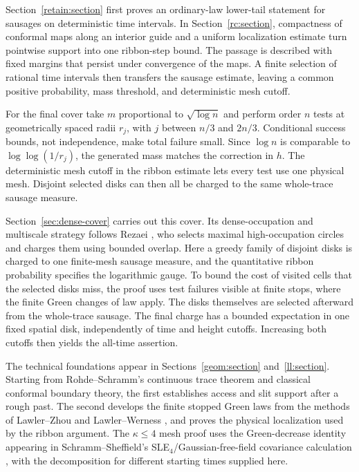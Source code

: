 Section~\ref{retain:section} first proves an ordinary-law lower-tail
statement for sausages on deterministic time intervals. In
Section~\ref{rc:section}, compactness of conformal maps along an interior
guide and a uniform localization estimate turn pointwise support into
one ribbon-step bound. The passage is described with fixed margins that
persist under convergence of the maps. A finite selection of rational
time intervals then transfers the sausage estimate, leaving a common
positive probability, mass threshold, and deterministic mesh cutoff.

For the final cover take $m$ proportional to $\sqrt{\log n}$ and
perform order $n$ tests at geometrically spaced radii $r_j$, with $j$ between
$n/3$ and $2n/3$. Conditional success bounds, not independence, make
total failure small. Since $\log n$ is comparable to
$\log\log(1/r_j)$, the generated mass matches the correction in
$h$. The deterministic mesh cutoff in the ribbon estimate lets
every test use one physical mesh. Disjoint selected disks can then
all be charged to the same whole-trace sausage measure.

Section~\ref{sec:dense-cover} carries out this cover. Its dense-occupation
and multiscale strategy follows Rezaei \cite[Section~3, especially
equations~(9)--(11)]{rezaei2018}, who selects maximal high-occupation
circles and charges them using bounded overlap. Here a greedy family
of disjoint disks is charged to one finite-mesh sausage measure, and
the quantitative ribbon probability specifies the logarithmic gauge.
To bound the cost of visited cells that the selected disks miss, the
proof uses test failures visible at finite stops, where the finite Green
changes of law apply. The disks themselves are selected afterward from
the whole-trace sausage. The final charge has a bounded expectation in
one fixed spatial disk, independently of time and height cutoffs.
Increasing both cutoffs then yields the all-time assertion.

The technical foundations appear in Sections~\ref{geom:section}
and~\ref{ll:section}. Starting from Rohde--Schramm's continuous trace
theorem \cite[Theorem~5.1]{rohdeschramm2005} and classical conformal
boundary theory, the first establishes access and slit support after a
rough past. The second develops the finite stopped Green laws from
the methods of Lawler--Zhou \cite[Section~2]{lawlerzhou2013} and
Lawler--Werness \cite[Sections~2.3--2.4]{lawlerwerness2013},
and proves the physical localization used by the ribbon argument.
The $\kappa\le4$ mesh proof uses the Green-decrease identity appearing in
Schramm--Sheffield's SLE$_4$/Gaussian-free-field covariance calculation
\cite[Lemmas~2.5--2.6]{schrammsheffield2013}, with the decomposition for
different starting times supplied here.
